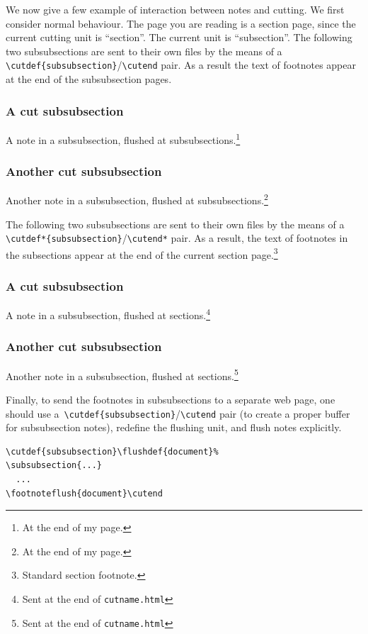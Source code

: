 \ifhevea
We now give a few example of interaction between notes and cutting.
We first consider normal behaviour.
The page you are reading is a section page, since the current
cutting unit is ``section''. The current unit is ``subsection''.
The following two subsubsections are sent to their own files by
the means of a \verb+\cutdef{subsubsection}+/\verb+\cutend+ pair.
As a result the text of footnotes appear at the end of the
subsubsection pages.
\subsubsection{A cut subsubsection}
A note in a subsubsection, flushed at subsubsections.\footnote{At the
end of my page.}
\subsubsection{Another cut subsubsection}
Another note in a subsubsection, flushed at subsubsections.\footnote{At the
end of my page.}
\cutend

The following two subsubsections are sent to their own files by
the means of a \verb+\cutdef*{subsubsection}+/\verb+\cutend*+ pair.
As a result, the text of footnotes in the subsections appear
at the end of the current section page.\footnote{Standard section footnote.}
\subsubsection{A cut subsubsection}
A note in a subsubsection, flushed at sections.\footnote{Sent at
the end of \texttt{cutname.html}}
\subsubsection{Another cut subsubsection}
Another note in a subsubsection, flushed at sections.\footnote{Sent at
the end of \texttt{cutname.html}}
\cutend*

Finally, to send the footnotes in subsubsections
to a separate web page, one should use
a~\verb+\cutdef{subsubsection}+/\verb+\cutend+ pair
(to create a proper buffer for subsubsection notes),
redefine the flushing unit, and flush notes explicitly.
\begin{verbatim}
\cutdef{subsubsection}\flushdef{document}%
\subsubsection{...}
  ...
\footnoteflush{document}\cutend
\end{verbatim}

